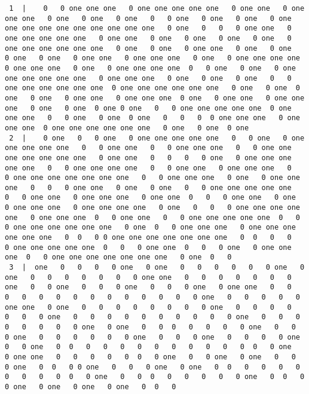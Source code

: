 \documentclass[
  letterpaper,
  DIV=11,
  numbers=noendperiod]{scrartcl}
\begin{document}
\begin{lstlisting}
 1  |    0   0 one one one   0 one one one one one   0 one one   0 one one one   0 one   0 one   0 one   0   0 one   0 one   0 one   0 one one one one one one one one one one   0 one   0   0   0 one one   0 one one one one one   0 one one   0 one   0 one   0 one   0 one   0 one one one one one one   0 one   0 one   0 one one   0 one   0 one   0 one   0 one   0 one one   0 one one one   0 one   0 one one one one   0 one one one   0 one   0 one one one one  0   0 one   0 one   0 one one one one one one   0 one one one   0 one   0 one   0 one   0   0 one one one one one one  0 one one one one one one   0 one   0 one  0 one   0 one   0 one one   0 one one one  0 one   0 one one   0 one one one   0 one   0 one  0 one 0 one   0   0 one one one one one  0 one one one   0   0 one   0 one  0 one   0   0   0  0 one one one   0 one one one  0 one one one one one one   0 one   0 one  0 one
 2  |    0 one   0   0 one   0 one one one one one   0   0 one   0 one one one one one   0   0 one one   0   0 one one one   0   0 one one one one one one one   0 one one   0   0   0   0 one   0 one one one one one   0   0 one one one one   0   0 one one   0 one one one   0   0 one one one one one one one   0   0 one one one   0 one   0 one one one   0   0   0 one one   0 one   0 one   0   0 one one one one one   0   0 one one   0 one one one   0 one one  0   0   0 one one   0 one   0 one one one   0 one one one one   0 one   0   0   0 one one one one one   0 one one one  0   0 one one   0   0 one one one one one  0   0   0 one one one one one one   0 one  0   0 one one one   0 one one one one one one   0  0   0 0 one one one one one one one   0  0   0   0   0 one one one one one  0   0   0 one one  0   0   0 one   0 one one one  0   0 one one one one one one one   0 one  0   0
 3  |  one   0   0   0   0 one   0 one   0   0   0   0   0   0 one   0 one   0   0   0   0   0   0   0 one one   0   0   0   0   0   0   0 one   0   0 one   0   0   0 one   0   0   0 one   0 one one   0   0   0   0   0   0   0   0   0   0   0   0   0   0 one   0   0   0   0   0 one one   0 one   0   0   0   0   0   0   0   0 one   0   0   0   0   0   0   0 one   0   0   0   0   0   0   0   0   0   0 one   0   0   0   0   0   0   0   0 one   0 one   0   0  0   0   0   0   0 one   0   0   0 one   0   0   0   0   0   0 one   0   0   0 one   0   0   0   0 one   0   0 one   0  0   0   0   0   0   0   0   0   0   0   0  0   0 one   0 one one   0   0   0   0   0  0   0 one   0   0 one   0 one   0   0   0 one   0  0   0 0 one   0   0   0 one   0 one   0  0   0   0   0   0   0   0   0   0  0   0 one   0   0  0   0   0   0   0   0 one   0  0   0   0 one   0 one   0 one   0 one   0  0   0
\end{lstlisting}
\end{document}
